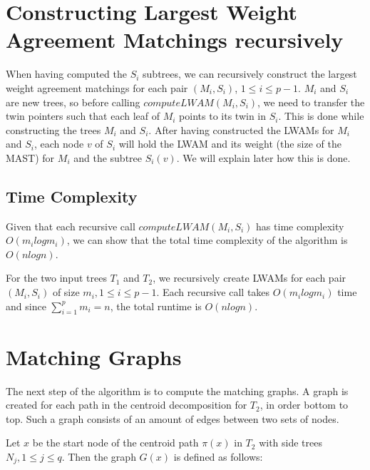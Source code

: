 \section{Constructing Largest Weight Agreement Matchings recursively}
When having computed the $S_i$ subtrees, we can recursively construct the largest weight agreement matchings for each pair $(M_i, S_i)$, $1 \le i \le p-1$. $M_i$ and $S_i$ are new trees, so before calling $computeLWAM(M_i, S_i)$, we need to transfer the twin pointers such that each leaf of $M_i$ points to its twin in $S_i$. This is done while constructing the trees $M_i$ and $S_i$.
After having constructed the LWAMs for $M_i$ and $S_i$, each node $v$ of $S_i$ will hold the LWAM and its weight (the size of the MAST) for $M_i$ and the subtree $S_i(v)$. We will explain later how this is done.

\subsection{Time Complexity}
Given that each recursive call $computeLWAM(M_i, S_i)$ has time complexity $O(m_ilogm_i)$, we can show that the total time complexity of the algorithm is $O(nlogn)$.

For the two input trees $T_1$ and $T_2$, we recursively create LWAMs for each pair $(M_i, S_i)$ of size $m_i, 1 \le i \le p-1$. Each recursive call takes $O(m_ilogm_i)$ time and since $\sum_{i=1}^p m_i = n$, the total runtime is $O(nlogn)$.

\section{Matching Graphs}
The next step of the algorithm is to compute the matching graphs. A graph is created for each path in the centroid decomposition for $T_2$, in order bottom to top. Such a graph consists of an amount of edges between two sets of nodes.

Let $x$ be the start node of the centroid path $\pi(x)$ in $T_2$ with side trees $N_j, 1 \le j \le q$. Then the graph $G(x)$ is defined as follows:

